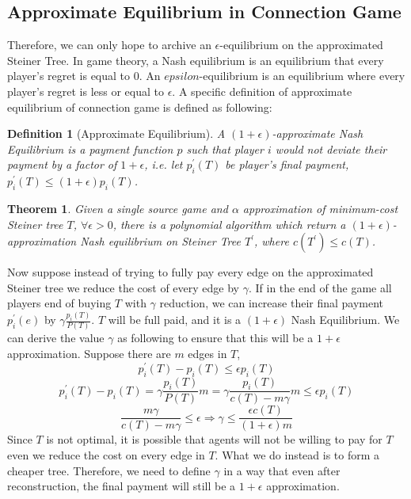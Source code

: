 \documentclass[11pt,psfig,times]{article}
\newtheorem{theorem}{Theorem}[section]
\newtheorem{definition}{Definition}[section]
\begin{document}
	\subsection{Approximate Equilibrium in Connection Game}
	Therefore, we can only hope to archive an $\epsilon$-equilibrium on the approximated Steiner Tree. In game theory, a Nash equilibrium is an equilibrium that every player's regret is equal to 0. An $epsilon$-equilibrium is an equilibrium where every player's regret is less or equal to $\epsilon$. A specific definition of approximate equilibrium of connection game is defined as following:
		\begin{definition}[Approximate Equilibrium]
			A \((1+\epsilon)\)-approximate Nash Equilibrium is a payment function \(p\) such that player \(i\) would not deviate their payment by a factor of \(1+\epsilon\), i.e. let $ p_i^{'}(T)$ be player's final payment,$ p_i^{'}(T) \leq (1+\epsilon)p_i(T)$.
		\end{definition}
		
	
		\begin{theorem}
			Given a single source game and \(\alpha\) approximation of minimum-cost Steiner tree \(T\), \(\forall \epsilon > 0\), there is a polynomial algorithm which return a \((1+\epsilon)\)-approximation \textit{Nash equilibrium} on Steiner Tree \(T^{'}\), where $c(T^{'}) \leq c(T)$.
		\end{theorem}
	
	
	
	Now suppose instead of trying to fully pay every edge on the approximated Steiner tree we reduce the cost of every edge by $\gamma$. If in the end of the game all players end of buying  $T$ with $\gamma$ reduction, we can increase their final payment $p_i^{'}(e)$ by $\gamma\frac{p_i(T)}{P(T)}$. $T$ will be full paid, and it is a $(1+\epsilon)$ Nash Equilibrium. We can derive the value $\gamma$ as following to ensure that this will be a $1+ \epsilon$ approximation. Suppose there are $m$ edges in $T$,
	\[p_i^{'}(T) - p_i(T) \leq \epsilon p_i(T)\]
	\[p_i^{'}(T) - p_i(T) =  \gamma\frac{p_i(T)}{P(T)}m =  \gamma\frac{p_i(T)}{c(T)-m\gamma}m \leq \epsilon p_i(T)\]
	\[ \frac{m\gamma}{c(T)-m\gamma} \leq \epsilon \Rightarrow \gamma \leq \frac{\epsilon c(T)}{(1+\epsilon)m}\]
	Since $T$ is not optimal, it is possible that agents will not be willing to pay for $T$ even we reduce the cost on every edge in $T$. What we do instead is to form a cheaper tree. Therefore, we need to define $\gamma$ in a way that even after reconstruction, the final payment will still be a $1+\epsilon$ approximation. 
	
\end{document}
